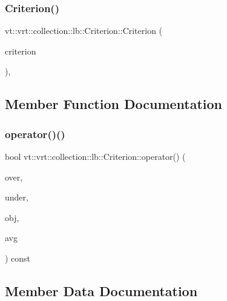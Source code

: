 \subsubsection{\texorpdfstring{Criterion()}{Criterion()}}
{\footnotesize\ttfamily vt\+::vrt\+::collection\+::lb\+::\+Criterion\+::\+Criterion (\begin{DoxyParamCaption}\item[{\hyperlink{namespacevt_1_1vrt_1_1collection_1_1lb_a4e454750e102cf5404d5ac151148951c}{Criterion\+Enum} const}]{criterion }\end{DoxyParamCaption})\hspace{0.3cm}{\ttfamily [inline]}, {\ttfamily [explicit]}}



\subsection{Member Function Documentation}
\mbox{\label{structvt_1_1vrt_1_1collection_1_1lb_1_1_criterion_a0e00fffc188ecbc09008fe84afb60643}} 
\subsubsection{\texorpdfstring{operator()()}{operator()()}}
{\footnotesize\ttfamily bool vt\+::vrt\+::collection\+::lb\+::\+Criterion\+::operator() (\begin{DoxyParamCaption}\item[{\hyperlink{namespacevt_a8fb51741340b87d7aaee0bef60e9896b}{Load\+Type}}]{over,  }\item[{\hyperlink{namespacevt_a8fb51741340b87d7aaee0bef60e9896b}{Load\+Type}}]{under,  }\item[{\hyperlink{namespacevt_a8fb51741340b87d7aaee0bef60e9896b}{Load\+Type}}]{obj,  }\item[{\hyperlink{namespacevt_a8fb51741340b87d7aaee0bef60e9896b}{Load\+Type}}]{avg }\end{DoxyParamCaption}) const\hspace{0.3cm}{\ttfamily [inline]}}



\subsection{Member Data Documentation}
\mbox{\label{structvt_1_1vrt_1_1collection_1_1lb_1_1_criterion_abec00c435938c265ec0b3e3d984c09a6}} 
